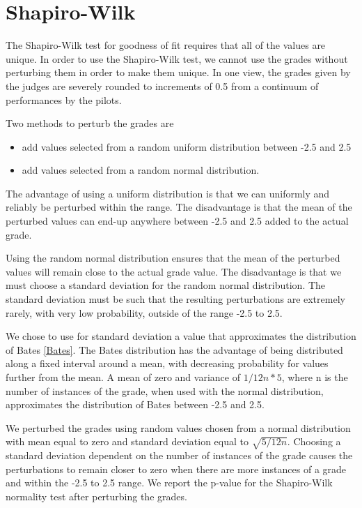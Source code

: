 \section{Shapiro-Wilk}

The Shapiro-Wilk test for goodness of fit requires that all of the values
are unique. In order to use the Shapiro-Wilk test, we
cannot use the grades without perturbing them in order to make them unique.
In one view, the grades given by the judges are severely rounded to increments
of 0.5 from a continuum of performances by the pilots.

Two methods to perturb the grades are
\begin{itemize}
\item add values selected from a random uniform distribution between -2.5 and
2.5
\item add values selected from a random normal distribution.
\end{itemize}

The advantage of using a uniform distribution is that we can uniformly and
reliably be perturbed within the range. The disadvantage is that the mean
of the perturbed values can end-up anywhere between -2.5 and 2.5 added to
the actual grade.

Using the random normal distribution ensures that the mean of the perturbed
values will remain close to the actual grade value. The disadvantage is that
we must choose a standard deviation for the random normal distribution.
The standard deviation must be such that the resulting perturbations are
extremely rarely, with very low probability, outside of the range -2.5 to
2.5.

We chose to use for standard deviation a value that approximates the
distribution of Bates \ref{Bates}. The Bates distribution has the
advantage of being distributed along a fixed interval around a mean, with
decreasing probability for values further from the mean.
A mean of zero and variance of $1/12n * 5$,
where n is the number of instances of the grade, when used
with the normal distribution, approximates the distribution of Bates between
-2.5 and 2.5.

We perturbed the grades using random values chosen from a normal distribution
with mean equal to zero and standard deviation equal to $\sqrt{5/12n}$.
Choosing a standard deviation dependent on the number of instances
of the grade causes the perturbations to remain closer to zero when there
are more instances of a grade and within the -2.5 to 2.5 range.
We report the p-value for the Shapiro-Wilk normality test after perturbing
the grades.
